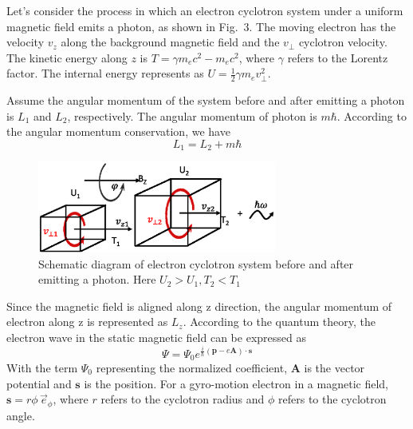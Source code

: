 \documentclass{cpbtex3}
\begin{document}
Let's consider the process in which an electron cyclotron system under a uniform magnetic field emits a photon, as shown in Fig.~3. The moving electron has the velocity $v_z$ along the background magnetic field and the $v_\perp$ cyclotron velocity. The kinetic energy along $z$ is $T = \gamma m_e c^2 - m_e c^2$, where $\gamma$ refers to the Lorentz factor. The internal energy represents as $U = \frac{1}{2} \gamma m_e v_\perp^2$. 

Assume the angular momentum of the system before and after emitting a photon is $L_1$ and $L_2$, respectively. The angular momentum of photon is $m\hbar$. According to the angular momentum conservation, we have
\begin{equation}
L_1 = L_2 + m\hbar \label{eq:AngularCon} 
\end{equation}

\begin{figure}
\centering
\includegraphics[width=0.7\textwidth]{Figure3.eps}%
\caption{\label{fig:Schematic}Schematic diagram of electron cyclotron system before and after emitting a photon. Here \(U_2>U_1, T_2<T_1\)}
\end{figure}


Since the magnetic field is aligned along z direction, the angular momentum of electron along z is represented as $L_z$. According to the quantum theory, the electron wave in the static magnetic field can be expressed as
\begin{equation}
\Psi = \Psi_0 e^{\frac{i}{\hbar} (\mathbf{p} - e\mathbf{A}) \cdot \mathbf{s}} \label{eq:psi}
\end{equation}
With the term $\Psi_0$ representing the normalized coefficient, $\mathbf{A}$ is the vector potential and $\mathbf{s}$ is the position. For a gyro-motion electron in a magnetic field, $\mathbf{s} = r\phi\,\vec{e}_\phi$, where $r$ refers to the cyclotron radius and $\phi$ refers to the cyclotron angle. 
\end{document}

